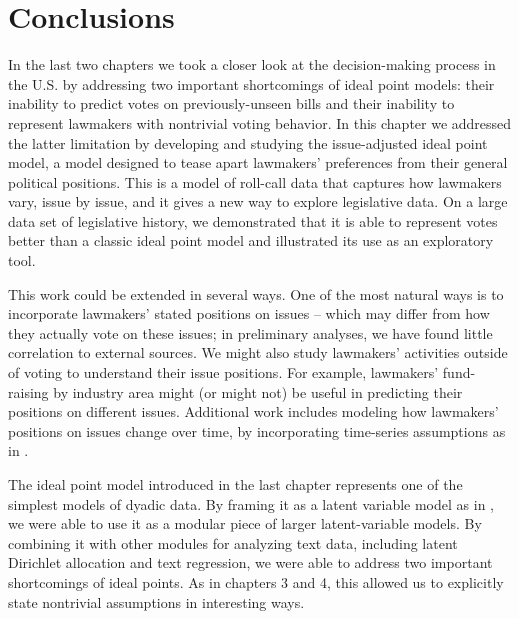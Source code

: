 
\section*{Conclusions}

In the last two chapters we took a closer look at the decision-making
process in the U.S. by addressing two important shortcomings of ideal point models:
their inability to predict votes on previously-unseen bills and their
inability to represent lawmakers with nontrivial voting behavior. In
this chapter we addressed the latter limitation by developing and
studying the issue-adjusted ideal point model, a model designed to
tease apart lawmakers' preferences from their general political
positions.  This is a model of roll-call data that captures how
lawmakers vary, issue by issue, and it gives a new way to explore
legislative data.  On a large data set of legislative history, we
demonstrated that it is able to represent votes better than a classic
ideal point model and illustrated its use as an exploratory tool.

This work could be extended in several ways.  One of the most natural
ways is to incorporate lawmakers' stated positions on issues -- which
may differ from how they actually vote on these issues; in preliminary
analyses, we have found little correlation to external sources.  We
might also study lawmakers' activities outside of voting to understand
their issue positions.  For example, lawmakers' fund-raising by
industry area might (or might not) be useful in predicting their
positions on different issues.  Additional work includes modeling how
lawmakers' positions on issues change over time, by incorporating
time-series assumptions as in \cite{martin:2002}.

The ideal point model introduced in the last chapter represents one of
the simplest models of dyadic data.  By framing it as a latent
variable model as in \cite{clinton:2004}, we were able to use it as a
modular piece of larger latent-variable models.  By combining it with
other modules for analyzing text data, including latent Dirichlet
allocation and text regression, we were able to address two important
shortcomings of ideal points.  As in chapters 3 and 4, this allowed us
to explicitly state nontrivial assumptions in interesting ways.
